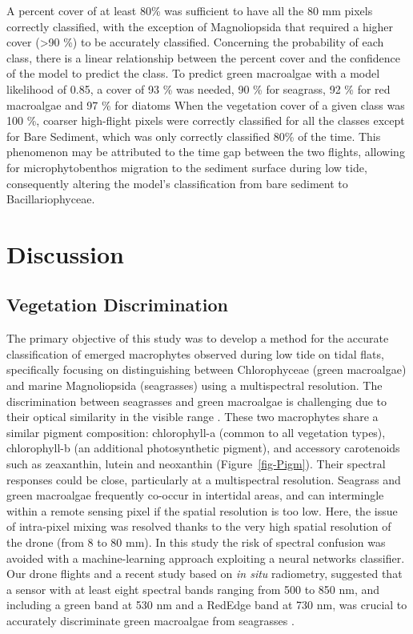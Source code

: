 \documentclass[
  number]{elsarticle}
\begin{document}
A percent cover of at least 80\% was sufficient to have all the 80 mm
pixels correctly classified, with the exception of Magnoliopsida that
required a higher cover (\textgreater90 \%) to be accurately classified.
Concerning the probability of each class, there is a linear relationship
between the percent cover and the confidence of the model to predict the
class. To predict green macroalgae with a model likelihood of 0.85, a
cover of 93 \% was needed, 90 \% for seagrass, 92 \% for red macroalgae
and 97 \% for diatoms When the vegetation cover of a given class was 100
\%, coarser high-flight pixels were correctly classified for all the
classes except for Bare Sediment, which was only correctly classified
80\% of the time. This phenomenon may be attributed to the time gap
between the two flights, allowing for microphytobenthos migration to the
sediment surface during low tide, consequently altering the model's
classification from bare sediment to Bacillariophyceae.

\section{Discussion}\label{discussion}

\subsection{Vegetation Discrimination}\label{vegetation-discrimination}

The primary objective of this study was to develop a method for the
accurate classification of emerged macrophytes observed during low tide
on tidal flats, specifically focusing on distinguishing between
Chlorophyceae (green macroalgae) and marine Magnoliopsida (seagrasses)
using a multispectral resolution. The discrimination between seagrasses
and green macroalgae is challenging due to their optical similarity in
the visible range
\citep{oiry2021using, bannari2022, veettil2020opportunities}. These two
macrophytes share a similar pigment composition: chlorophyll-a (common
to all vegetation types), chlorophyll-b (an additional photosynthetic
pigment), and accessory carotenoids such as zeaxanthin, lutein and
neoxanthin (Figure~\ref{fig-Pigm}). Their spectral responses could be
close, particularly at a multispectral resolution. Seagrass and green
macroalgae frequently co-occur in intertidal areas, and can intermingle
within a remote sensing pixel if the spatial resolution is too low.
Here, the issue of intra-pixel mixing was resolved thanks to the very
high spatial resolution of the drone (from 8 to 80 mm). In this study
the risk of spectral confusion was avoided with a machine-learning
approach exploiting a neural networks classifier. Our drone flights and
a recent study based on \emph{in situ} radiometry, suggested that a
sensor with at least eight spectral bands ranging from 500 to 850 nm,
and including a green band at 530 nm and a RedEdge band at 730 nm, was
crucial to accurately discriminate green macroalgae from seagrasses
\citep{Davies2023}.
\end{document}
